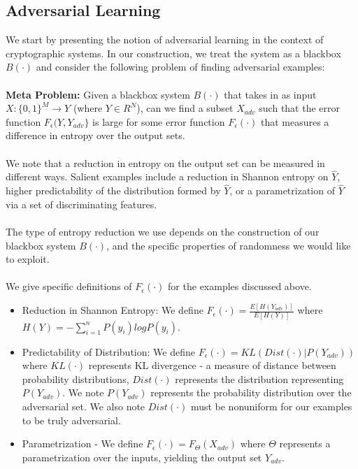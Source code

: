 \subsection{Adversarial Learning}
We start by presenting the notion of adversarial learning in the context of cryptographic systems. In our construction, we treat the system as a blackbox $B(\cdot)$ and consider the following problem of finding adversarial examples:
\\
\\
\textbf{Meta Problem:} Given a blackbox system $B(\cdot)$ that takes in as input $X: \{0,1\}^{M} \rightarrow Y$ (where $Y \in R^{N}$), can we find a subset $X_{adv}$ such that the error function $F_{\epsilon} (Y, Y_{adv} \}$ is large for some error function $F_{\epsilon}(\cdot )$ that measures a difference in entropy over the output sets.
\\
\\
We note that a reduction in entropy on the output set can be measured in different ways. Salient examples include a reduction in Shannon entropy on $\hat{Y}$, higher predictability of the distribution formed by $\hat{Y}$, or a parametrization of $\hat{Y}$ via a set of discriminating features.
\\
\\
The type of entropy reduction we use depends on the construction of our blackbox system $B(\cdot)$, and the specific properties of randomness we would like to exploit.  
\\
\\
We give specific definitions of $F_{\epsilon}(\cdot)$ for the examples discussed above. 
\begin{itemize}
\item Reduction in Shannon Entropy: We define $F_{\epsilon} (\cdot) = \frac{E[H(Y_{adv})]}{E[H(Y)]}$ where $H(Y) = -\sum_{i=1}^{n} P(y_{i}) log P(y_{i})$.  
\item Predictability of Distribution: We define $F_{\epsilon} (\cdot) = KL(Dist (\cdot) | P(Y_{adv}))$ where $KL(\cdot)$ represents KL divergence - a measure of distance between probability distributions, $Dist(\cdot)$ represents the distribution representing $P(Y_{adv})$. We note $P(Y_{adv})$ represents the probability distribution over the adversarial set. We also note $Dist(\cdot)$ must be nonuniform for our examples to be truly adversarial. 
\item Parametrization - We define $F_{\epsilon} (\cdot) = F_{\Theta}(X_{adv})$ where $\Theta$ represents a parametrization over the inputs, yielding the output set $Y_{adv}$.
\end{itemize}



